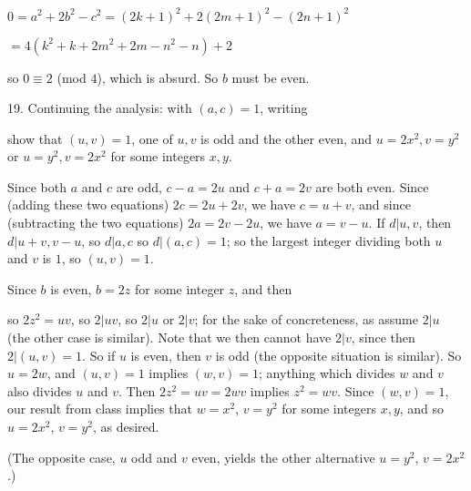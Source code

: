 \ssk

\item{} $0=a^2+2b^2-c^2=(2k+1)^2+2(2m+1)^2-(2n+1)^2$

\hfill $=4(k^2+k+2m^2+2m-n^2-n)+2$

\ssk

\item{} so $0\equiv 2$ (mod $4$), which is absurd. So $b$ must be even.

\bsk

\item{19.} Continuing the analysis: with $(a,c)=1$, writing 

\ssk


\ssk

\item{} show that $(u,v)=1$, one of $u,v$ is odd and the other even, and 
$u=2x^2,v=y^2$ or $u=y^2,v=2x^2$ for some integers $x,y$.

\msk

\item{} Since both $a$ and $c$ are odd, $c-a=2u$ and $c+a=2v$ are both even. Since (adding these two equations)
$2c=2u+2v$, we have $c=u+v$, and since (subtracting the two equations) $2a=2v-2u$, we have $a=v-u$.
If $d|u,v$, then $d|u+v,v-u$, so $d|a,c$ so $d|(a,c)=1$; so the largest integer dividing both
$u$ and $v$ is $1$, so $(u,v)=1$. 

\ssk

\item{} Since $b$ is even, $b=2z$ for some integer $z$, and then 


\item{} so $2z^2=uv$, so $2|uv$, so $2|u$ or $2|v$; for the sake of concreteness, as assume $2|u$
(the other case is similar). Note that we then cannot have $2|v$, since then $2|(u,v)=1$.
So if $u$ is even, then $v$ is odd (the opposite situation is similar). So $u=2w$, and
$(u,v)=1$ implies $(w,v)=1$; anything which divides $w$ and $v$ also divides $u$ and $v$.
Then $2z^2=uv=2wv$ implies $z^2=wv$. Since $(w,v)=1$, our result from class implies that
$w=x^2$, $v=y^2$ for some integers $x,y$, and so $u=2x^2$, $v=y^2$, as desired.

\ssk

\item{} (The opposite case, $u$ odd and $v$ even, yields the other alternative $u=y^2$, $v=2x^2$.)

